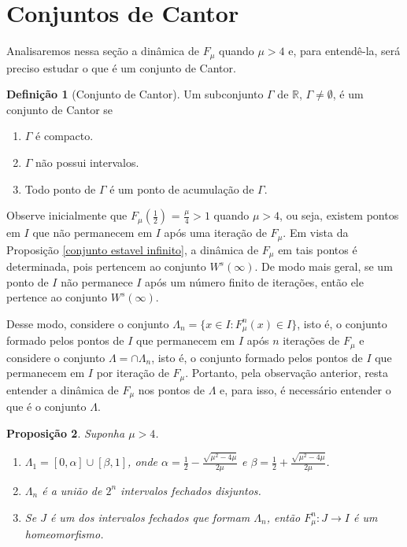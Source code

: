 \documentclass[a4paper, 12pt]{article}
\theoremstyle{definition}
\newtheorem{definition}{Definição}[section]
\theoremstyle{plain}
\newtheorem{proposition}[definition]{Proposição}
\theoremstyle{plain}
\theoremstyle{plain}
\theoremstyle{remark}
\newcommand{\RR}{\mathbb{R}}
\begin{document}
\section{Conjuntos de Cantor}

Analisaremos nessa seção a dinâmica de $F_\mu$ quando $\mu > 4$ e, para entendê-la, será preciso estudar o que é um conjunto de Cantor.

\begin{definition}[Conjunto de Cantor]
Um subconjunto $\Gamma$ de $\RR$, $\Gamma \neq \emptyset$, é um conjunto de Cantor se
\begin{enumerate}
\item $\Gamma$ é compacto.
\item $\Gamma$ não possui intervalos.
\item Todo ponto de $\Gamma$ é um ponto de acumulação de $\Gamma$.
\end{enumerate}
\end{definition}

Observe inicialmente que $F_\mu(\frac{1}{2})$ = $\frac{\mu}{4} > 1$ quando $\mu > 4$, ou seja, existem pontos em $I$ que não permanecem em $I$ após uma iteração de $F_\mu$. Em vista da Proposição \ref{conjunto estavel infinito}, a dinâmica de $F_\mu$ em tais pontos é determinada, pois pertencem ao conjunto $W^s(\infty)$. De modo mais geral, se um ponto de $I$ não permanece $I$ após um número finito de iterações, então ele pertence ao conjunto $W^s(\infty)$. 

Desse modo, considere o conjunto $\Lambda_n = \{x \in I : F^n_\mu (x) \in I\}$, isto é, o conjunto formado pelos pontos de $I$ que permanecem em $I$ após $n$ iterações de $F_\mu$ e considere o conjunto $\Lambda = \cap \Lambda_n$, isto é, o conjunto formado pelos pontos de $I$ que permanecem em $I$ por iteração de $F_\mu$. Portanto, pela observação anterior, resta entender a dinâmica de $F_\mu$ nos pontos de $\Lambda$ e, para isso, é necessário entender o que é o conjunto $\Lambda$.

\begin{proposition}
Suponha $\mu > 4$.
\begin{enumerate}
\item $\Lambda_1 = [0, \alpha] \cup [\beta, 1]$, onde $\alpha = \frac{1}{2} - \frac{\sqrt{\mu^2 - 4\mu}}{2\mu}$ e $\beta = \frac{1}{2} + \frac{\sqrt{\mu^2 - 4\mu}}{2\mu}$.
\item $\Lambda_n$ é a união de $2^n$ intervalos fechados disjuntos.
\item Se $J$ é um dos intervalos fechados que formam $\Lambda_n$, então $F^n_\mu: J \rightarrow I$ é um homeomorfismo.
\end{enumerate}
\end{proposition}
\end{document}
